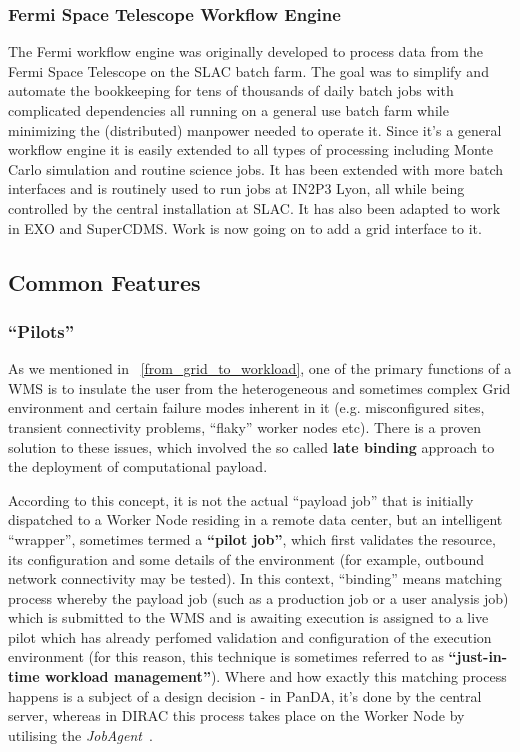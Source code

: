 \subsubsection{Fermi Space Telescope Workflow Engine}
The Fermi workflow engine was originally developed to process data from the Fermi Space Telescope on the SLAC batch farm. The goal was to simplify and 
automate the bookkeeping for tens of thousands of daily batch jobs with complicated dependencies all running on a general use batch farm while 
minimizing the (distributed) manpower needed to operate it. Since it's a general workflow engine it is easily extended to all types of processing 
including 
Monte Carlo simulation and routine science jobs. It has been extended with more batch interfaces and is routinely used to run jobs at IN2P3 Lyon, 
all while being controlled by the central installation at SLAC. It has also been adapted to work in EXO and SuperCDMS. Work is now going on to add a 
grid interface to it.


\subsection{Common Features}

\subsubsection{``Pilots''}
As we mentioned in ~\ref{from_grid_to_workload}, one of the primary functions of a WMS is to insulate the user from the heterogeneous and sometimes complex
Grid environment and certain failure modes inherent in it (e.g. misconfigured sites, transient connectivity problems, ``flaky'' worker nodes etc).
There is a proven solution to these issues, which involved the so called \textbf{late binding} approach  to the deployment of computational payload.

According to this concept, it is not the actual ``payload job'' that is initially dispatched to a  Worker Node residing in a
remote data center, but an intelligent ``wrapper'', sometimes termed a \textbf{``pilot job''}, which first validates the resource, its configuration and
some details of the environment (for example, outbound network connectivity may be tested). In this context, ``binding'' means matching process
whereby the payload job (such as a production job or a user analysis job) which is submitted to the WMS and is awaiting execution is assigned to a
live pilot which has already perfomed validation and configuration of the execution environment (for this reason, this technique is sometimes referred
to as \textbf{``just-in-time workload management''}). Where and how exactly this matching process happens is a subject of a design decision - in PanDA, it's done by
the central server, whereas in DIRAC this process takes place on the Worker Node by utilising the \textit{JobAgent}~\cite{dirac_chep10}.

